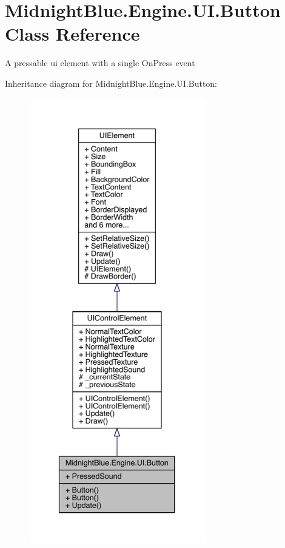 \hypertarget{class_midnight_blue_1_1_engine_1_1_u_i_1_1_button}{}\section{Midnight\+Blue.\+Engine.\+U\+I.\+Button Class Reference}
\label{class_midnight_blue_1_1_engine_1_1_u_i_1_1_button}


A pressable ui element with a single On\+Press event  




Inheritance diagram for Midnight\+Blue.\+Engine.\+U\+I.\+Button\+:
\nopagebreak
\begin{figure}[H]
\begin{center}
\leavevmode
\includegraphics[height=550pt]{class_midnight_blue_1_1_engine_1_1_u_i_1_1_button__inherit__graph}
\end{center}
\end{figure}


